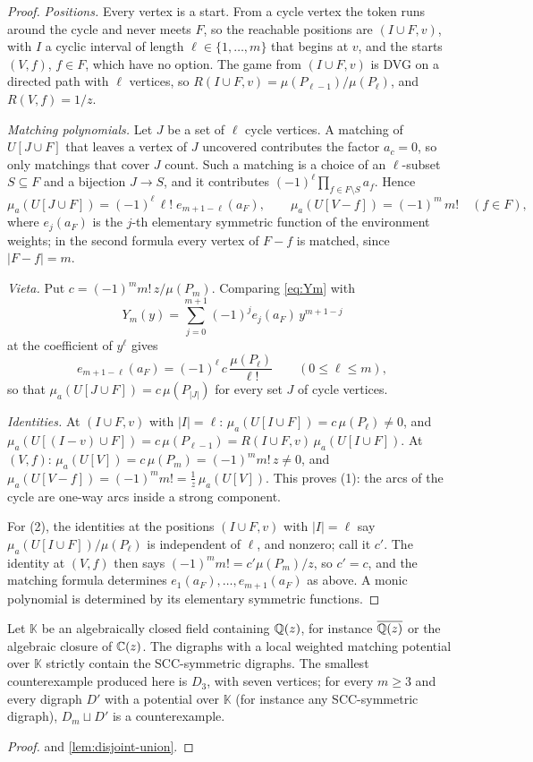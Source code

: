 \begin{proof}
\emph{Positions.} Every vertex is a start. From a cycle vertex the token runs around the cycle and never meets $F$, so the reachable positions are $(I\cup F,v)$, with $I$ a cyclic interval of length $\ell\in\{1,\dots,m\}$ that begins at $v$, and the starts $(V,f)$, $f\in F$, which have no option. The game from $(I\cup F,v)$ is DVG on a directed path with $\ell$ vertices, so $R(I\cup F,v)=\mu(P_{\ell-1})/\mu(P_\ell)$, and $R(V,f)=1/z$.

\emph{Matching polynomials.} Let $J$ be a set of $\ell$ cycle vertices. A matching of $U[J\cup F]$ that leaves a vertex of $J$ uncovered contributes the factor $a_c=0$, so only matchings that cover $J$ count. Such a matching is a choice of an $\ell$-subset $S\subseteq F$ and a bijection $J\to S$, and it contributes $(-1)^{\ell}\prod_{f\in F\setminus S}a_f$. Hence
\[
\mu_a(U[J\cup F])=(-1)^{\ell}\,\ell!\;e_{m+1-\ell}(a_F),\qquad \mu_a(U[V-f])=(-1)^{m}\,m!\quad(f\in F),
\]
where $e_j(a_F)$ is the $j$-th elementary symmetric function of the environment weights; in the second formula every vertex of $F-f$ is matched, since $|F-f|=m$.

\emph{Vieta.} Put $c=(-1)^{m}m!\,z/\mu(P_m)$. Comparing \eqref{eq:Ym} with
\[
Y_m(y)=\sum_{j=0}^{m+1}(-1)^{j}e_j(a_F)\,y^{m+1-j}
\]
at the coefficient of $y^{\ell}$ gives
\[
e_{m+1-\ell}(a_F)=(-1)^{\ell}\,c\,\frac{\mu(P_\ell)}{\ell!}\qquad(0\le\ell\le m),
\]
so that $\mu_a(U[J\cup F])=c\,\mu(P_{|J|})$ for every set $J$ of cycle vertices.

\emph{Identities.} At $(I\cup F,v)$ with $|I|=\ell$: $\mu_a(U[I\cup F])=c\,\mu(P_\ell)\neq0$, and $\mu_a(U[(I-v)\cup F])=c\,\mu(P_{\ell-1})=R(I\cup F,v)\,\mu_a(U[I\cup F])$. At $(V,f)$: $\mu_a(U[V])=c\,\mu(P_m)=(-1)^{m}m!\,z\neq0$, and $\mu_a(U[V-f])=(-1)^{m}m!=\frac1z\,\mu_a(U[V])$. This proves (1): the arcs of the cycle are one-way arcs inside a strong component.

For (2), the identities at the positions $(I\cup F,v)$ with $|I|=\ell$ say $\mu_a(U[I\cup F])/\mu(P_\ell)$ is independent of $\ell$, and nonzero; call it $c'$. The identity at $(V,f)$ then says $(-1)^{m}m!=c'\mu(P_m)/z$, so $c'=c$, and the matching formula determines $e_1(a_F),\dots,e_{m+1}(a_F)$ as above. A monic polynomial is determined by its elementary symmetric functions.
\end{proof}

\begin{corollary}\label{cor:complex-false}
Let $\mathbb K$ be an algebraically closed field containing $\mathbb{Q}(z)$, for instance $\overline{\mathbb{Q}(z)}$ or the algebraic closure of $\mathbb{C}(z)$. The digraphs with a local weighted matching potential over $\mathbb K$ strictly contain the SCC-symmetric digraphs. The smallest counterexample produced here is $D_3$, with seven vertices; for every $m\ge3$ and every digraph $D'$ with a potential over $\mathbb K$ (for instance any SCC-symmetric digraph), $D_m\sqcup D'$ is a counterexample.
\end{corollary}
\begin{proof}
 and \cref{lem:disjoint-union}.
\end{proof}


